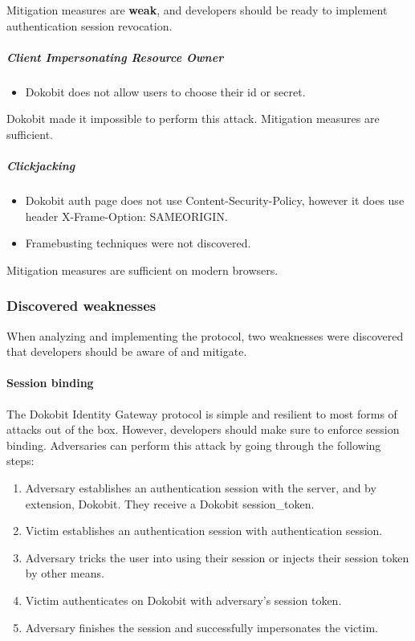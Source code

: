 Mitigation measures are \textbf{weak}, and developers should be ready to implement authentication session revocation.

\subparagraph{Client Impersonating Resource Owner}

\begin{itemize}
  \item Dokobit does not allow users to choose their id or secret.
\end{itemize}

Dokobit made it impossible to perform this attack. Mitigation measures are sufficient.

\subparagraph{Clickjacking}

\begin{itemize}
  \item Dokobit auth page does not use Content-Security-Policy, however it does use header X-Frame-Option: {SAMEORIGIN}.
  \item Framebusting \cite{RYDSTEDT2010BUSTI} techniques were not discovered.
\end{itemize}

Mitigation measures are sufficient on modern browsers.

\subsubsection{Discovered weaknesses}

When analyzing and implementing the protocol, two weaknesses were discovered that developers should be aware of and mitigate.

\paragraph{Session binding}


The Dokobit Identity Gateway protocol is simple and resilient to most forms of attacks out of the box. However, developers should make sure to enforce session binding. Adversaries can perform this attack by going through the following steps:

\begin{enumerate}
  \item Adversary establishes an authentication session with the server, and by extension, Dokobit. They receive a Dokobit session\_token.
  \item Victim establishes an authentication session with authentication session.
  \item Adversary tricks the user into using their session or injects their session token by other means.
  \item Victim authenticates on Dokobit with adversary's session token.
  \item Adversary finishes the session and successfully impersonates the victim.
\end{enumerate}

